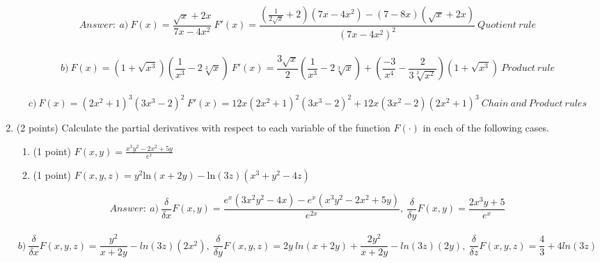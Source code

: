 \documentclass{article}%
\begin{document}
\begin{enumerate}
\begin{equation*} Answer: \ a) \ F(x) = \frac{\sqrt{x}+2x}{7x-4x^2} \ F'(x) = \frac{(\frac{1}{2\sqrt{x}} + 2)(7x - 4x^2) - (7 - 8x)(\sqrt{x} + 2x)}{(7x - 4x^2)^2} \ Quotient \ rule
\end{equation*} \\
\begin{equation*} b) \ F(x) = (1 + \sqrt{x^3})(\frac{1}{x^3} - 2\sqrt[3]{x}) \ F'(x) = \frac{3\sqrt{x}}{2}(\frac{1}{x^3} - 2\sqrt[3]{x}) + (\frac{-3}{x^4}-\frac{2}{3\sqrt[3]{x^2}})(1 + \sqrt{x^3}) \ Product \ rule
\end{equation*} \\
\begin{equation*} c) \ F(x) = (2x^2+1)^3(3x^3-2)^2 \ F'(x) = 12x(2x^2 + 1)^2(3x^3 - 2)^2 + 12x(3x^2 - 2)(2x^2 + 1)^3 \ Chain \ and \ Product \ rules
\end{equation*}

\item (2 points) Calculate the partial derivatives with respect to each variable of the function $F(\cdot)$ in each of the following cases.
\begin{enumerate}
    \item (1 point) $F(x,y) = \frac{x^3y^2 - 2x^2 + 5y}{e^x}$\\
    \item (1 point) $F(x,y,z) = y^2\mathrm{ln}(x+2y) -  \mathrm{ln}(3z)(x^3 + y^2 -4z)$
\end{enumerate}

\begin{equation*} Answer: \ a) \ \frac{\delta}{\delta x} F(x, y) = \frac{e^x(3x^2y^2 - 4x) - e^x(x^3y^2 - 2x^2 + 5y)}{e^{2x}}, \ \frac{\delta}{\delta y} F(x, y) = \frac{2x^3y + 5}{e^x}
\end{equation*} \\
\begin{equation*} b) \ \frac{\delta}{\delta x} F(x, y, z) = \frac{y^2}{x + 2y} - ln(3z)(2x^2), \ \frac{\delta}{\delta y} F(x, y, z) = 2y \ ln(x + 2y) + \frac{2y^2}{x + 2y} - ln(3z)(2y), \ \frac{\delta}{\delta z} F(x, y, z) = \frac{4}{3} + 4ln (3z)
\end{equation*}



\end{enumerate}
\end{document}
